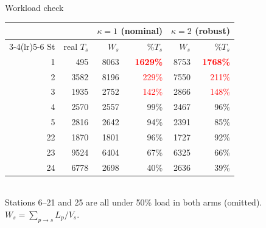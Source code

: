 \documentclass[11pt,aspectratio=169]{beamer}
\newcommand{\kk}{\kappa}
\begin{document}
\begin{frame}{Workload check}
  \begin{center}\footnotesize
  \begin{tabular}{@{}rrrrrr@{}}
    \toprule
    \multicolumn{2}{c}{} & \multicolumn{2}{c}{$\kk=1$ (nominal)} & \multicolumn{2}{c}{$\kk=2$ (robust)}\\
    \cmidrule(lr){3-4}\cmidrule(lr){5-6}
    St & real $T_s$ & $W_s$ & \%$T_s$ & $W_s$ & \%$T_s$ \\
    \midrule
    \rowcolor{red!10}
    1  & 495   & 8063 & \textcolor{red}{\textbf{1629\%}} & 8753 & \textcolor{red}{\textbf{1768\%}} \\
    2  & 3582  & 8196 & \textcolor{red}{229\%}           & 7550 & \textcolor{red}{211\%}           \\
    3  & 1935  & 2752 & \textcolor{red}{142\%}           & 2866 & \textcolor{red}{148\%}           \\
    4  & 2570  & 2557 & 99\%  & 2467 & 96\% \\
    5  & 2816  & 2642 & 94\%  & 2391 & 85\% \\
    22 & 1870  & 1801 & 96\%  & 1727 & 92\% \\
    23 & 9524  & 6404 & 67\%  & 6325 & 66\% \\
    24 & 6778  & 2698 & 40\%  & 2636 & 39\% \\
    \bottomrule
  \end{tabular}\\[+0.8em]
  {\scriptsize Stations 6--21 and 25 are all under 50\% load in both arms (omitted). $W_s = \sum_{p\to s} L_p / V_s$.}
  \end{center}
\end{frame}
\end{document}
